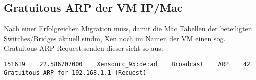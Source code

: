 \subsection{Gratuitous ARP der VM IP/Mac}

Nach einer Erfolgreichen Migration muss, damit die Mac Tabellen der beteiligten Switches/Bridges aktuell sindm, Xen noch im Namen der VM einen sog. Gratuitous ARP Request senden dieser sieht so aus:

\setupVerbatimOut
\begin{verbatim}
151619    22.586707000    Xensourc_95:de:ad    Broadcast    ARP    42    Gratuitous ARP for 192.168.1.1 (Request)
\end{verbatim}